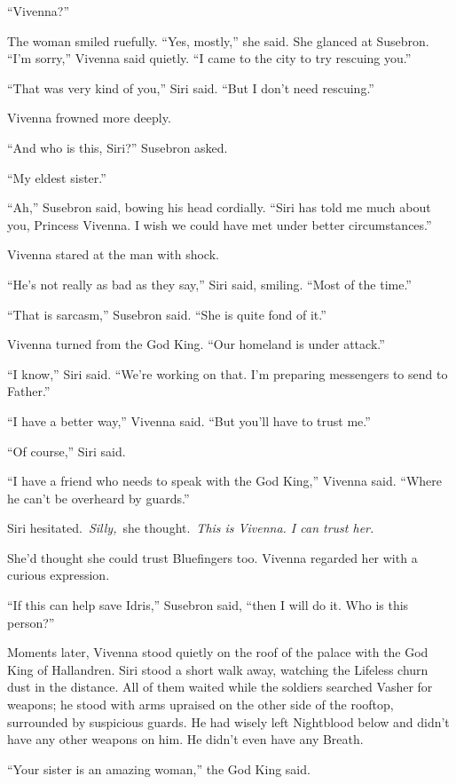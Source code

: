 “Vivenna?”

The woman smiled ruefully. “Yes, mostly,” she said. She glanced at Susebron. “I’m sorry,” Vivenna said quietly. “I came to the city to try rescuing you.”

“That was very kind of you,” Siri said. “But I don’t need rescuing.”

Vivenna frowned more deeply.

“And who is this, Siri?” Susebron asked.

“My eldest sister.”

“Ah,” Susebron said, bowing his head cordially. “Siri has told me much about you, Princess Vivenna. I wish we could have met under better circumstances.”

Vivenna stared at the man with shock.

“He’s not really as bad as they say,” Siri said, smiling. “Most of the time.”

“That is sarcasm,” Susebron said. “She is quite fond of it.”

Vivenna turned from the God King. “Our homeland is under attack.”

“I know,” Siri said. “We’re working on that. I’m preparing messengers to send to Father.”

“I have a better way,” Vivenna said. “But you’ll have to trust me.”

“Of course,” Siri said.

“I have a friend who needs to speak with the God King,” Vivenna said. “Where he can’t be overheard by guards.”

Siri hesitated.~\textit{Silly,}~she thought.~\textit{This is Vivenna. I can trust her.}

She’d thought she could trust Bluefingers too. Vivenna regarded her with a curious expression.

“If this can help save Idris,” Susebron said, “then I will do it. Who is this person?”

\orn

Moments later, Vivenna stood quietly on the roof of the palace with the God King of Hallandren. Siri stood a short walk away, watching the Lifeless churn dust in the distance. All of them waited while the soldiers searched Vasher for weapons; he stood with arms upraised on the other side of the rooftop, surrounded by suspicious guards. He had wisely left Nightblood below and didn’t have any other weapons on him. He didn’t even have any Breath.

“Your sister is an amazing woman,” the God King said.

